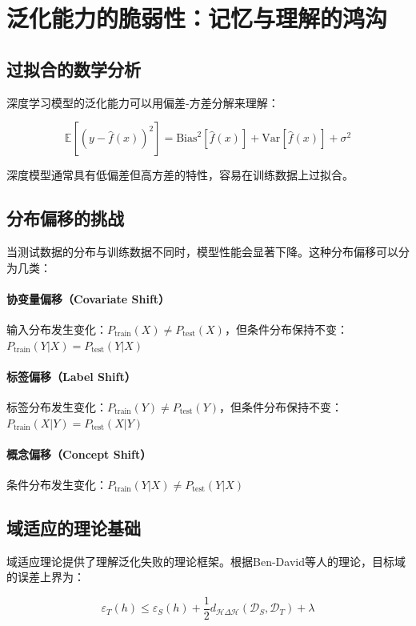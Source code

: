 \section{泛化能力的脆弱性：记忆与理解的鸿沟}

\subsection{过拟合的数学分析}

深度学习模型的泛化能力可以用偏差-方差分解来理解：

$$\mathbb{E}[(y - \hat{f}(x))^2] = \text{Bias}^2[\hat{f}(x)] + \text{Var}[\hat{f}(x)] + \sigma^2$$

深度模型通常具有低偏差但高方差的特性，容易在训练数据上过拟合。

\subsection{分布偏移的挑战}

当测试数据的分布与训练数据不同时，模型性能会显著下降。这种分布偏移可以分为几类：

\paragraph{协变量偏移（Covariate Shift）}
输入分布发生变化：$P_{\text{train}}(X) \neq P_{\text{test}}(X)$，但条件分布保持不变：$P_{\text{train}}(Y|X) = P_{\text{test}}(Y|X)$

\paragraph{标签偏移（Label Shift）}
标签分布发生变化：$P_{\text{train}}(Y) \neq P_{\text{test}}(Y)$，但条件分布保持不变：$P_{\text{train}}(X|Y) = P_{\text{test}}(X|Y)$

\paragraph{概念偏移（Concept Shift）}
条件分布发生变化：$P_{\text{train}}(Y|X) \neq P_{\text{test}}(Y|X)$

\subsection{域适应的理论基础}

域适应理论提供了理解泛化失败的理论框架。根据Ben-David等人的理论，目标域的误差上界为：

$$\varepsilon_T(h) \leq \varepsilon_S(h) + \frac{1}{2}d_{\mathcal{H}\Delta\mathcal{H}}(\mathcal{D}_S, \mathcal{D}_T) + \lambda$$

